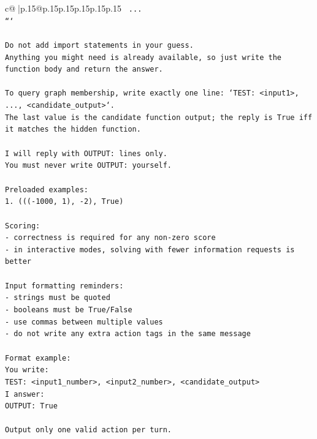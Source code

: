 \documentclass{article}
\begin{document}
{\begin{supertabular}{c@{$\;$}|p{.15\linewidth}@{}p{.15\linewidth}p{.15\linewidth}p{.15\linewidth}p{.15\linewidth}p{.15\linewidth}}
{{{\texttt{    ...} \\
\texttt{```} \\
\\ 
\texttt{Do not add import statements in your guess.} \\
\texttt{Anything you might need is already available, so just write the function body and return the answer.} \\
\\ 
\texttt{To query graph membership, write exactly one line: `TEST: <input1>, ..., <candidate\_output>`.} \\
\texttt{The last value is the candidate function output; the reply is True iff it matches the hidden function.} \\
\\ 
\texttt{I will reply with OUTPUT: lines only.} \\
\texttt{You must never write OUTPUT: yourself.} \\
\\ 
\texttt{Preloaded examples:} \\
\texttt{1. ((({-}1000, 1), {-}2), True)} \\
\\ 
\texttt{Scoring:} \\
\texttt{{-} correctness is required for any non{-}zero score} \\
\texttt{{-} in interactive modes, solving with fewer information requests is better} \\
\\ 
\texttt{Input formatting reminders:} \\
\texttt{{-} strings must be quoted} \\
\texttt{{-} booleans must be True/False} \\
\texttt{{-} use commas between multiple values} \\
\texttt{{-} do not write any extra action tags in the same message} \\
\\ 
\texttt{Format example:} \\
\texttt{You write:} \\
\texttt{TEST: <input1\_number>, <input2\_number>, <candidate\_output>} \\
\texttt{I answer:} \\
\texttt{OUTPUT: True} \\
\\ 
\texttt{Output only one valid action per turn.} \\
            }
        }
    }
     \\ \\


\end{supertabular}}
\end{document}
